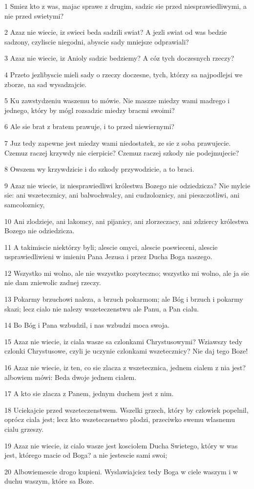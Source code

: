 \par 1 Smiez kto z was, majac sprawe z drugim, sadzic sie przed niesprawiedliwymi, a nie przed swietymi?
\par 2 Azaz nie wiecie, iz swieci beda sadzili swiat? A jezli swiat od was bedzie sadzony, czyliscie niegodni, abyscie sady mniejsze odprawiali?
\par 3 Azaz nie wiecie, iz Anioly sadzic bedziemy? A cóz tych doczesnych rzeczy?
\par 4 Przeto jezlibyscie mieli sady o rzeczy doczesne, tych, którzy sa najpodlejsi we zborze, na sad wysadzajcie.
\par 5 Ku zawstydzeniu waszemu to mówie. Nie maszze miedzy wami madrego i jednego, który by mógl rozsadzic miedzy bracmi swoimi?
\par 6 Ale sie brat z bratem prawuje, i to przed niewiernymi?
\par 7 Juz tedy zapewne jest miedzy wami niedostatek, ze sie z soba prawujecie. Czemuz raczej krzywdy nie cierpicie? Czemuz raczej szkody nie podejmujecie?
\par 8 Owszem wy krzywdzicie i do szkody przywodzicie, a to braci.
\par 9 Azaz nie wiecie, iz niesprawiedliwi królestwa Bozego nie odziedzicza? Nie mylcie sie: ani wszetecznicy, ani balwochwalcy, ani cudzoloznicy, ani pieszczotliwi, ani samcoloznicy,
\par 10 Ani zlodzieje, ani lakomcy, ani pijanicy, ani zlorzeczacy, ani zdziercy królestwa Bozego nie odziedzicza.
\par 11 A takimiscie niektórzy byli; alescie omyci, alescie poswieceni, alescie usprawiedliwieni w imieniu Pana Jezusa i przez Ducha Boga naszego.
\par 12 Wszystko mi wolno, ale nie wszystko pozyteczno; wszystko mi wolno, ale ja sie nie dam zniewolic zadnej rzeczy.
\par 13 Pokarmy brzuchowi naleza, a brzuch pokarmom; ale Bóg i brzuch i pokarmy skazi; lecz cialo nie nalezy wszeteczenstwu ale Panu, a Pan cialu.
\par 14 Bo Bóg i Pana wzbudzil, i nas wzbudzi moca swoja.
\par 15 Azaz nie wiecie, iz ciala wasze sa czlonkami Chrystusowymi? Wziawszy tedy czlonki Chrystusowe, czyli je uczynie czlonkami wszetecznicy? Nie daj tego Boze!
\par 16 Azaz nie wiecie, iz ten, co sie zlacza z wszetecznica, jednem cialem z nia jest? albowiem mówi: Beda dwoje jednem cialem.
\par 17 A kto sie zlacza z Panem, jednym duchem jest z nim.
\par 18 Uciekajcie przed wszeteczenstwem. Wszelki grzech, który by czlowiek popelnil, oprócz ciala jest; lecz kto wszeteczenstwo plodzi, przeciwko swemu wlasnemu cialu grzeszy.
\par 19 Azaz nie wiecie, iz cialo wasze jest kosciolem Ducha Swietego, który w was jest, którego macie od Boga? a nie jestescie sami swoi;
\par 20 Albowiemescie drogo kupieni. Wyslawiajciez tedy Boga w ciele waszym i w duchu waszym, które sa Boze.

